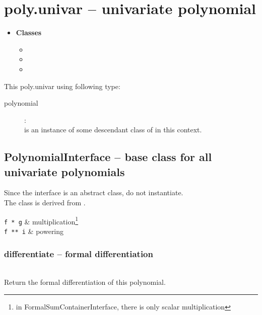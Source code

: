 

 \section{poly.univar -- univariate polynomial}
 \begin{itemize}
   \item {\bf Classes}
   \begin{itemize}
     \item \negok{}
     \item \negok{}
     \item {}
   \end{itemize}
 \end{itemize}

 This poly.univar using following type:
 \begin{description}
   \item[polynomial]:\\
      is an instance of some descendant class of
     in this context.
 \end{description}

\C

 \subsection{PolynomialInterface -- base class for all univariate polynomials}
 \initialize
  Since the interface is an abstract class, do not instantiate.\\
  The class is derived from .
  \spacing
  \begin{op}
    \verb+f * g+ & multiplication\footnote{in FormalSumContainerInterface, there is only scalar multiplication}\\
    \verb+f ** i+ & powering\\
  \end{op} 
  \method
  \subsubsection{differentiate -- formal differentiation}
   \\
   \spacing
   \quad Return the formal differentiation of this polynomial.
